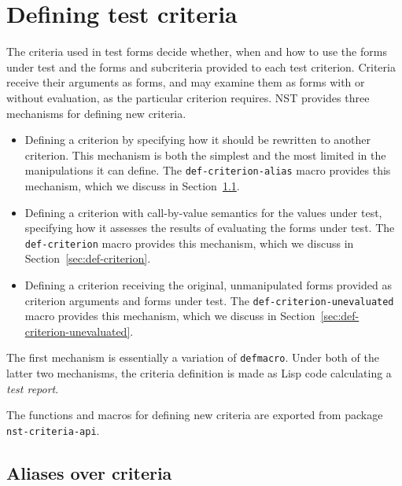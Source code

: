
\section{Defining test criteria}
The criteria used in test forms decide whether, when and how to use
the forms under test and the forms and subcriteria provided to each
test criterion.  Criteria receive their arguments as forms, and may
examine them as forms with or without evaluation, as the particular
criterion requires.  NST provides three mechanisms for defining new
criteria.
\begin{itemize}
\item Defining a criterion by specifying how it should be rewritten to
  another criterion.  This mechanism is both the simplest and the most
  limited in the manipulations it can define.  The
  \texttt{def-criterion-alias} macro provides this mechanism, which we
  discuss in Section~\ref{sec:def-criterion-alias}.
\item Defining a criterion with call-by-value semantics for the values
  under test, specifying how it assesses the results of evaluating the
  forms under test.  The \texttt{def-criterion} macro provides this
  mechanism, which we discuss in Section~\ref{sec:def-criterion}.
\item Defining a criterion receiving the original, unmanipulated forms
  provided as criterion arguments and forms under test.  The
  \texttt{def-criterion-unevaluated} macro provides this mechanism,
  which we discuss in Section~\ref{sec:def-criterion-unevaluated}.
\end{itemize}
The first mechanism is essentially a variation of \texttt{defmacro}.
Under both of the latter two mechanisms, the criteria definition is
made as Lisp code calculating a \emph{test report}.

The functions and macros for defining new criteria are exported from
package \texttt{nst-criteria-api}.

\subsection{Aliases over criteria}
\label{sec:def-criterion-alias}


